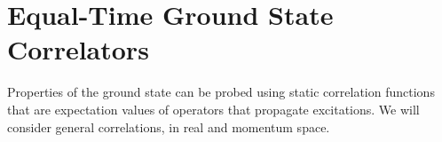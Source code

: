 \documentclass[reprint,hidelinks,onecolumn]{revtex4-2}
\begin{document}

\section{Equal-Time Ground State Correlators}\label{staticCorr}
Properties of the ground state can be probed using static correlation functions that are expectation values of operators that propagate excitations. We will consider general correlations, in real and momentum space.
\end{document}
